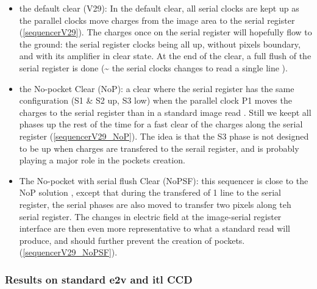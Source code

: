 \begin{itemize}
\tightlist
\item
  the default clear (V29): In the default clear, all serial clocks are
  kept up as the parallel clocks move charges from the image area to the
  serial register (\hyperref[sequencerV29]{{[}sequencerV29{]}}). The
  charges once on the serial register will hopefully flow to the ground:
  the serial register clocks being all up, without pixels boundary, and
  with its amplifier in clear state. At the end of the clear, a full
  flush of the serial register is done (\textasciitilde{} the serial
  clocks changes to read a single line ).
\item
  the No-pocket Clear (NoP): a clear where the serial register has the
  same configuration (S1 \& S2 up, S3 low) when the parallel clock P1
  moves the charges to the serial register than in a standard image read
  . Still we keept all phases up the rest of the time for a fast clear
  of the charges along the serial register
  (\hyperref[sequencerV29_NoP]{{[}sequencerV29\_NoP{]}}). The idea is
  that the S3 phase is not designed to be up when charges are transfered
  to the serail register, and is probably playing a major role in the
  pockets creation.
\item
  The No-pocket with serial flush Clear (NoPSF): this sequencer is close
  to the NoP solution , except that during the transfered of 1 line to
  the serial register, the serial phases are also moved to transfer two
  pixels along teh serial register. The changes in electric field at the
  image-serial register interface are then even more representative to
  what a standard read will produce, and should further prevent the
  creation of pockets.
  (\hyperref[sequencerV29_NoPSF]{{[}sequencerV29\_NoPSF{]}}).
\end{itemize}

\subsubsection{Results on standard e2v and itl
CCD}\label{results-on-standard-e2v-and-itl-ccd}

